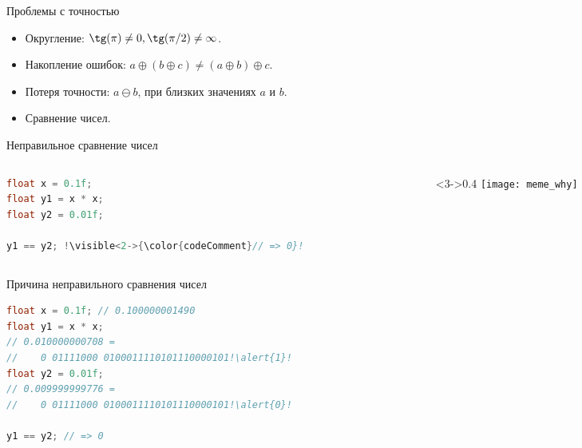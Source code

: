 \begin{frame}{Проблемы с точностью}

  \begin{itemize}
    \item Округление: $\tg(\pi) \neq 0, \tg(\pi/2) \neq \infty$.
    \item Накопление ошибок:
      $a \oplus (b \oplus c) \neq (a \oplus b) \oplus c$.
    \item Потеря точности:
      $a \ominus b$, при близких значениях $a$ и $b$.
    \item Сравнение чисел.
  \end{itemize}

\end{frame}

\begin{frame}[fragile]{Неправильное сравнение чисел}

  \begin{columns}[onlytextwidth,c]
    \begin{column}{0.6\textwidth}
      \begin{lstlisting}[language=C,escapechar=\!]
float x = 0.1f;
float y1 = x * x;
float y2 = 0.01f;

y1 == y2; !\visible<2->{\color{codeComment}// => 0}!
      \end{lstlisting}
    \end{column}

    \begin{column}<3->{0.4\textwidth}
      \texttt{[image: meme\_why]}
    \end{column}

  \end{columns}

\end{frame}

\begin{frame}[fragile]{Причина неправильного сравнения чисел}

  \begin{lstlisting}[language=C,escapechar=\!]
float x = 0.1f; // 0.100000001490
float y1 = x * x;
// 0.010000000708 =
//    0 01111000 0100011110101110000101!\alert{1}!
float y2 = 0.01f;
// 0.009999999776 =
//    0 01111000 0100011110101110000101!\alert{0}!

y1 == y2; // => 0
  \end{lstlisting}

\end{frame}

